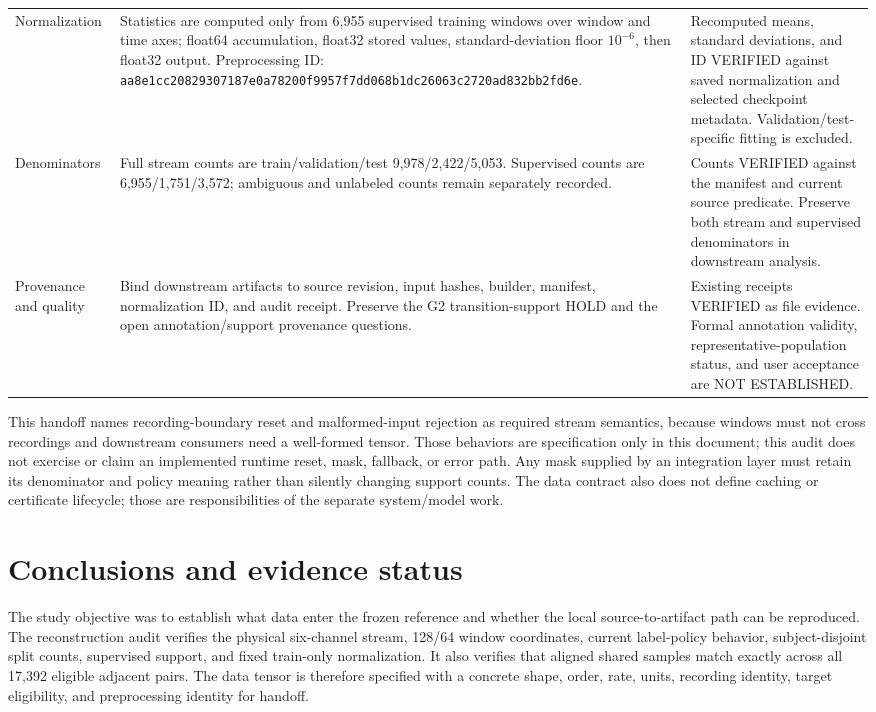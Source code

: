 \documentclass[11pt,a4paper]{article}
\newcommand{\code}[1]{{\small\ttfamily\nolinkurl{#1}}}
\begin{document}
{\begin{longtable}{@{}P{2.65cm}P{6.2cm}P{6.1cm}@{}}
Normalization & Statistics are computed only from 6,955 supervised training windows over window and time axes; float64 accumulation, float32 stored values, standard-deviation floor $10^{-6}$, then float32 output. Preprocessing ID: \code{aa8e1cc20829307187e0a78200f9957f7dd068b1dc26063c2720ad832bb2fd6e}. & Recomputed means, standard deviations, and ID VERIFIED against saved normalization and selected checkpoint metadata. Validation/test-specific fitting is excluded.\\
Denominators & Full stream counts are train/validation/test 9,978/2,422/5,053. Supervised counts are 6,955/1,751/3,572; ambiguous and unlabeled counts remain separately recorded. & Counts VERIFIED against the manifest and current source predicate. Preserve both stream and supervised denominators in downstream analysis.\\
Provenance and quality & Bind downstream artifacts to source revision, input hashes, builder, manifest, normalization ID, and audit receipt. Preserve the G2 transition-support HOLD and the open annotation/support provenance questions. & Existing receipts VERIFIED as file evidence. Formal annotation validity, representative-population status, and user acceptance are NOT ESTABLISHED.\\
\bottomrule\end{longtable}}

This handoff names recording-boundary reset and malformed-input rejection as required stream semantics, because windows must not cross recordings and downstream consumers need a well-formed tensor. Those behaviors are specification only in this document; this audit does not exercise or claim an implemented runtime reset, mask, fallback, or error path. Any mask supplied by an integration layer must retain its denominator and policy meaning rather than silently changing support counts. The data contract also does not define caching or certificate lifecycle; those are responsibilities of the separate system/model work.

\section{Conclusions and evidence status}
The study objective was to establish what data enter the frozen reference and whether the local source-to-artifact path can be reproduced. The reconstruction audit verifies the physical six-channel stream, 128/64 window coordinates, current label-policy behavior, subject-disjoint split counts, supervised support, and fixed train-only normalization. It also verifies that aligned shared samples match exactly across all 17,392 eligible adjacent pairs. The data tensor is therefore specified with a concrete shape, order, rate, units, recording identity, target eligibility, and preprocessing identity for handoff.
\end{document}
